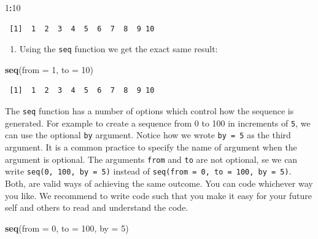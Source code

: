 \documentclass[]{article}
\newenvironment{Shaded}{\begin{snugshade}}{\end{snugshade}}
\newcommand{\DataTypeTok}[1]{\textcolor[rgb]{0.13,0.29,0.53}{#1}}
\newcommand{\DecValTok}[1]{\textcolor[rgb]{0.00,0.00,0.81}{#1}}
\newcommand{\KeywordTok}[1]{\textcolor[rgb]{0.13,0.29,0.53}{\textbf{#1}}}
\newcommand{\NormalTok}[1]{#1}
\newcommand{\OperatorTok}[1]{\textcolor[rgb]{0.81,0.36,0.00}{\textbf{#1}}}
\providecommand{\tightlist}{%
  \setlength{\itemsep}{0pt}\setlength{\parskip}{0pt}}
\begin{document}
\begin{Shaded}
\begin{Highlighting}[]
\DecValTok{1}\OperatorTok{:}\DecValTok{10}
\end{Highlighting}
\end{Shaded}

\begin{verbatim}
 [1]  1  2  3  4  5  6  7  8  9 10
\end{verbatim}

\begin{enumerate}
\def\labelenumi{\arabic{enumi}.}
\tightlist
\item
  Using the \texttt{seq} function we get the exact same result:
\end{enumerate}

\begin{Shaded}
\begin{Highlighting}[]
\KeywordTok{seq}\NormalTok{(}\DataTypeTok{from =} \DecValTok{1}\NormalTok{, }\DataTypeTok{to =} \DecValTok{10}\NormalTok{)}
\end{Highlighting}
\end{Shaded}

\begin{verbatim}
 [1]  1  2  3  4  5  6  7  8  9 10
\end{verbatim}

The \texttt{seq} function has a number of options which control how the sequence is generated. For example to create a sequence from 0 to 100 in increments of \texttt{5}, we can use the optional \texttt{by} argument. Notice how we wrote \texttt{by\ =\ 5} as the third argument. It is a common practice to specify the name of argument when the argument is optional. The arguments \texttt{from} and \texttt{to} are not optional, se we can write \texttt{seq(0,\ 100,\ by\ =\ 5)} instead of \texttt{seq(from\ =\ 0,\ to\ =\ 100,\ by\ =\ 5)}. Both, are valid ways of achieving the same outcome. You can code whichever way you like. We recommend to write code such that you make it easy for your future self and others to read and understand the code.

\begin{Shaded}
\begin{Highlighting}[]
\KeywordTok{seq}\NormalTok{(}\DataTypeTok{from =} \DecValTok{0}\NormalTok{, }\DataTypeTok{to =} \DecValTok{100}\NormalTok{, }\DataTypeTok{by =} \DecValTok{5}\NormalTok{)}
\end{Highlighting}
\end{Shaded}
\end{document}
